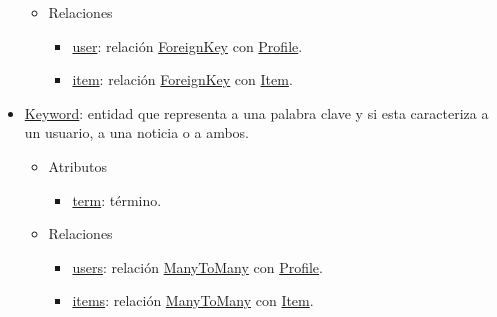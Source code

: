 \begin{itemize}
\begin{itemize}
\begin{itemize}
        \end{itemize}
        \item Relaciones
        \begin{itemize}
            \item \underline{user}: relación \underline{ForeignKey} con \underline{Profile}.
            \item \underline{item}: relación \underline{ForeignKey} con \underline{Item}.
        \end{itemize}
    \end{itemize}
    \item \underline{Keyword}: entidad que representa a una palabra clave y si esta caracteriza a un usuario, a una noticia o a ambos.
    \begin{itemize}
        \item Atributos
        \begin{itemize}
            \item \underline{term}: término.
        \end{itemize}
        \item Relaciones
        \begin{itemize}
            \item \underline{users}: relación \underline{ManyToMany} con \underline{Profile}.
            \item \underline{items}: relación \underline{ManyToMany} con \underline{Item}.
        \end{itemize}
    \end{itemize}
\end{itemize}